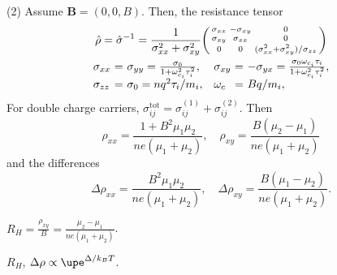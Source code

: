 \begin{solution}\leavevmode
  \begin{enumext*}[label = (\alph*), columns = 2]
    \item(2) Assume $\bm B = (0,0,B)$. Then, the resistance tensor
    \begin{gather*}
        \hat\rho = \hat\sigma^{-1}
      = \frac{1}{\sigma_{xx}^2 + \sigma_{xy}^2}
      \begin{psmallmatrix}
        \sigma_{xx} & -\sigma_{xy} & 0\\
        \sigma_{xy} & \sigma_{xx}  & 0\\
        0 & 0 & (\sigma_{xx}^2+\sigma_{xy}^2)/\sigma_{zz}
      \end{psmallmatrix}\\
      \begin{array}{@{}l@{~}c@{~}l@{\quad}l@{~}c@{~}l@{}}
        \sigma_{xx} & = & \sigma_{yy}
      = \frac{\sigma_0}{1 + \omega_{c_i}^2\tau_i^2}, &
        \sigma_{xy} & = & -\sigma_{yx}
      = \frac{\sigma_0\omega_{c_i}\tau_i}{1 + \omega_{c_i}^2\tau_i^2},\\
        \sigma_{zz} & = & \sigma_0 = nq^2\tau_i/m_i, &
        \omega_c    & = & Bq/m_i,
      \end{array}
    \end{gather*}
    For double charge carriers,
    $\sigma_{ij}^\text{tot} = \sigma_{ij}^{(1)} + \sigma_{ij}^{(2)}$.
    Then
    \[
      \rho_{xx} = \frac{1 + B^2\mu_1 \mu_2}{ne(\mu_1 + \mu_2)}, \quad
      \rho_{xy} = \frac{B(\mu_2 - \mu_1)}{ne(\mu_1 + \mu_2)}
    \]
    and the differences
    \[
      \Delta\rho_{xx} = \frac{B^2\mu_1\mu_2}{ne(\mu_1 + \mu_2)},\quad
      \Delta\rho_{xy} = \frac{B(\mu_1 - \mu_2)}{ne(\mu_1 + \mu_2)}.
    \]
    \item $R_H = \frac{\rho_{xy}}B = \frac{\mu_2 - \mu_1}{ne(\mu_1 + \mu_2)}$.
    \item $R_H$, $\Delta \rho \propto \upe^{\Delta/k_BT}$.
  \end{enumext*}
\end{solution}

